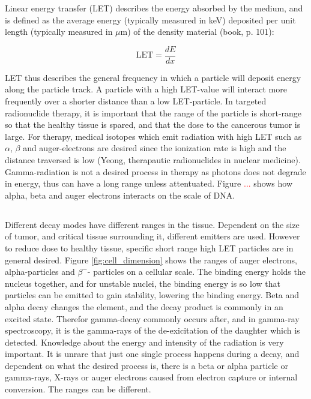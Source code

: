 \noindent 
Linear energy transfer (LET) describes the energy absorbed by the medium, and is defined as the  average energy (typically measured in keV) deposited per unit length (typically measured in $\mu$m) of the density material (book, p. 101):

\begin{equation}
    \text{LET} = \frac{dE}{dx}
\end{equation}

\noindent 
LET thus describes the general frequency in which a particle will deposit energy along the particle track. A particle with a high LET-value will interact more frequently over a shorter distance than a low LET-particle. In targeted radionuclide therapy, it is important that the range of the particle is short-range so that the healthy tissue is spared, and that the dose to the cancerous tumor is large. For therapy, medical isotopes which emit radiation with high LET such as $\alpha$, $\beta$ and auger-electrons are desired since the ionization rate is high and the distance traversed is low (Yeong, therapautic radionuclides in nuclear medicine). Gamma-radiation is not a desired process in therapy as photons does not degrade in energy, thus can have a long range unless attentuated. 
Figure \textcolor{red}{...} shows how alpha, beta and auger electrons interacts on the scale of DNA. \\


\subsection*{}

Different decay modes have different ranges in the tissue. Dependent on the size of tumor, and critical tissue surrounding it, different emitters are used. However to reduce dose to healthy tissue, specific short range high LET particles are in general desired. Figure \ref{fig:cell_dimension} shows the ranges of auger electrons, alpha-particles and $\beta^-$- particles on a cellular scale. The binding energy holds the nucleus together, and for unstable nuclei, the binding energy is so low that particles can be emitted to gain stability, lowering the binding energy. Beta and alpha decay changes the element, and the decay product is commonly in an excited state. Therefor gamma-decay commonly occurs after, and in gamma-ray spectroscopy, it is the gamma-rays of the de-exicitation of the daughter which is detected. Knowledge about the energy and intensity of the radiation is very important. It is unrare that just one single process happens during a decay, and dependent on what the desired process is, there is a beta or alpha particle or gamma-rays, X-rays or auger electrons caused from electron capture or internal conversion. The ranges can be different. \\ 

